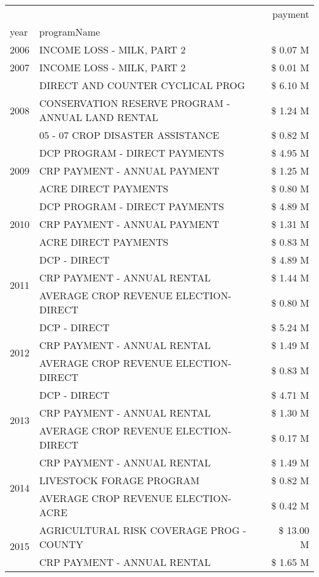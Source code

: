 \begin{tabular}{llr}
\toprule
 &  & payment \\
year & programName &  \\
\midrule
2006 & INCOME LOSS - MILK, PART 2 & \$ 0.07 M \\
\cline{1-3}
2007 & INCOME LOSS - MILK, PART 2 & \$ 0.01 M \\
\cline{1-3}
\multirow[t]{3}{*}{2008} & DIRECT AND COUNTER CYCLICAL PROG & \$ 6.10 M \\
 & CONSERVATION RESERVE PROGRAM - ANNUAL LAND RENTAL & \$ 1.24 M \\
 & 05 - 07 CROP DISASTER ASSISTANCE & \$ 0.82 M \\
\cline{1-3}
\multirow[t]{3}{*}{2009} & DCP PROGRAM - DIRECT PAYMENTS & \$ 4.95 M \\
 & CRP PAYMENT - ANNUAL PAYMENT & \$ 1.25 M \\
 & ACRE DIRECT PAYMENTS & \$ 0.80 M \\
\cline{1-3}
\multirow[t]{3}{*}{2010} & DCP PROGRAM - DIRECT PAYMENTS & \$ 4.89 M \\
 & CRP PAYMENT - ANNUAL PAYMENT & \$ 1.31 M \\
 & ACRE DIRECT PAYMENTS & \$ 0.83 M \\
\cline{1-3}
\multirow[t]{3}{*}{2011} & DCP - DIRECT & \$ 4.89 M \\
 & CRP PAYMENT - ANNUAL RENTAL & \$ 1.44 M \\
 & AVERAGE CROP REVENUE ELECTION-DIRECT & \$ 0.80 M \\
\cline{1-3}
\multirow[t]{3}{*}{2012} & DCP - DIRECT & \$ 5.24 M \\
 & CRP PAYMENT - ANNUAL RENTAL & \$ 1.49 M \\
 & AVERAGE CROP REVENUE ELECTION-DIRECT & \$ 0.83 M \\
\cline{1-3}
\multirow[t]{3}{*}{2013} & DCP - DIRECT & \$ 4.71 M \\
 & CRP PAYMENT - ANNUAL RENTAL & \$ 1.30 M \\
 & AVERAGE CROP REVENUE ELECTION-DIRECT & \$ 0.17 M \\
\cline{1-3}
\multirow[t]{3}{*}{2014} & CRP PAYMENT - ANNUAL RENTAL & \$ 1.49 M \\
 & LIVESTOCK FORAGE PROGRAM & \$ 0.82 M \\
 & AVERAGE CROP REVENUE ELECTION-ACRE & \$ 0.42 M \\
\cline{1-3}
\multirow[t]{3}{*}{2015} & AGRICULTURAL RISK COVERAGE PROG - COUNTY & \$ 13.00 M \\
 & CRP PAYMENT - ANNUAL RENTAL & \$ 1.65 M \\

\end{tabular}

